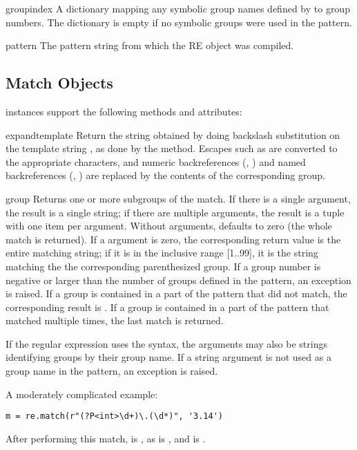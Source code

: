 \begin{memberdesc}[RegexObject]{groupindex}
A dictionary mapping any symbolic group names defined by
 to group numbers.  The dictionary is empty if no
symbolic groups were used in the pattern.
\end{memberdesc}

\begin{memberdesc}[RegexObject]{pattern}
The pattern string from which the RE object was compiled.
\end{memberdesc}


\subsection{Match Objects \label{match-objects}}

 instances support the following methods and
attributes:

\begin{methoddesc}[MatchObject]{expand}{template}
 Return the string obtained by doing backslash substitution on the
template string , as done by the  method.
Escapes such as  are converted to the appropriate
characters, and numeric backreferences (, ) and
named backreferences (, ) are replaced
by the contents of the corresponding group.
\end{methoddesc}

\begin{methoddesc}[MatchObject]{group}{}
Returns one or more subgroups of the match.  If there is a single
argument, the result is a single string; if there are
multiple arguments, the result is a tuple with one item per argument.
Without arguments,  defaults to zero (the whole match
is returned).
If a  argument is zero, the corresponding return value is the
entire matching string; if it is in the inclusive range [1..99], it is
the string matching the the corresponding parenthesized group.  If a
group number is negative or larger than the number of groups defined
in the pattern, an  exception is raised.
If a group is contained in a part of the pattern that did not match,
the corresponding result is .  If a group is contained in a
part of the pattern that matched multiple times, the last match is
returned.

If the regular expression uses the  syntax,
the  arguments may also be strings identifying groups by
their group name.  If a string argument is not used as a group name in
the pattern, an  exception is raised.

A moderately complicated example:

\begin{verbatim}
m = re.match(r"(?P<int>\d+)\.(\d*)", '3.14')
\end{verbatim}

After performing this match,  is , as is
, and  is .
\end{methoddesc}

